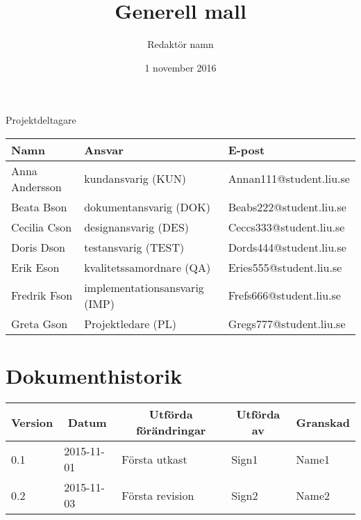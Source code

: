 \documentclass[10pt,oneside,swedish]{lips}
\title{Generell mall}
\author{Redaktör namn}
\date{1 november 2016}
\begin{document}
\maketitle

\cleardoublepage
\makeprojectid

\begin{center}
  \Large Projektdeltagare
\end{center}
\begin{center}
  \begin{tabular}{|l|l|l|}
    \hline
    \textbf{Namn} & \textbf{Ansvar} & \textbf{E-post}\\
    \hline
    Anna Andersson & kundansvarig (KUN) & Annan111@student.liu.se\\
    \hline
    Beata Bson & dokumentansvarig (DOK) & Beabs222@student.liu.se\\
    \hline
    Cecilia Cson & designansvarig (DES) & Ceccs333@student.liu.se\\
    \hline
    Doris Dson & testansvarig (TEST) & Dords444@student.liu.se\\
    \hline
    Erik Eson & kvalitetssamordnare (QA) & Eries555@student.liu.se\\
    \hline
    Fredrik Fson & implementationsansvarig (IMP) & Frefs666@student.liu.se\\
    \hline
    Greta Gson & Projektledare (PL) & Gregs777@student.liu.se\\
    \hline
  \end{tabular}
\end{center}


\cleardoublepage
\tableofcontents

\cleardoublepage
\section*{Dokumenthistorik}
\begin{tabular}{p{}|p{}|p{}|p{}|p{}} 
  \multicolumn{1}{c}{\bfseries Version} & 
  \multicolumn{1}{|c}{\bfseries Datum} & 
  \multicolumn{1}{|c}{\bfseries Utförda förändringar} & 
  \multicolumn{1}{|c}{\bfseries Utförda av} & 
  \multicolumn{1}{|c}{\bfseries Granskad}\\
  \hline
  \hline
  0.1 & 2015-11-01 & Första utkast & Sign1 & Name1   \\
  \hline
  0.2 & 2015-11-03 & Första revision & Sign2 & Name2   \\
  \hline
\end{tabular}
\end{document}
